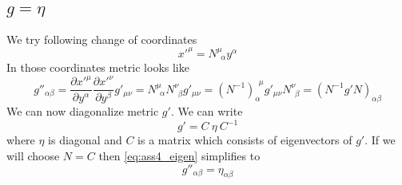 \subsection{\texorpdfstring{$g=\eta$}{TEXT}}

We try following change of coordinates
%
\begin{equation}
    x'^\mu = N_{~~\alpha}^{\mu~~} y^\alpha
\end{equation}
%
In those coordinates metric looks like
%
\begin{equation}
    g''_{\alpha\beta} = 
    \frac{\partial x'^\mu}{\partial y^\alpha}
    \frac{\partial x'^\nu}{\partial y^\beta} g'_{\mu\nu} = 
    N^{\mu~~}_{~~\alpha} N^{\nu~~}_{~~\beta} g'_{\mu\nu} =
    (N^{-1})^{~~\mu}_{\alpha~~} g'_{\mu\nu} N^{\nu~~}_{~~\beta} = 
    (N^{-1} g' N)_{\alpha\beta}
    \label{eq:ass4_eigen}
\end{equation}
%
We can now diagonalize metric $g'$. We can write 
%
\begin{equation}
    g' = C~\eta~C^{-1}
\end{equation}
%
where $\eta$ is diagonal and $C$ is a matrix which consists of eigenvectors of
$g'$. If we will choose $N=C$ then \autoref{eq:ass4_eigen} simplifies to
%
\begin{equation}
    \boxed{g''_{\alpha\beta} = \eta_{\alpha\beta}}
\end{equation}